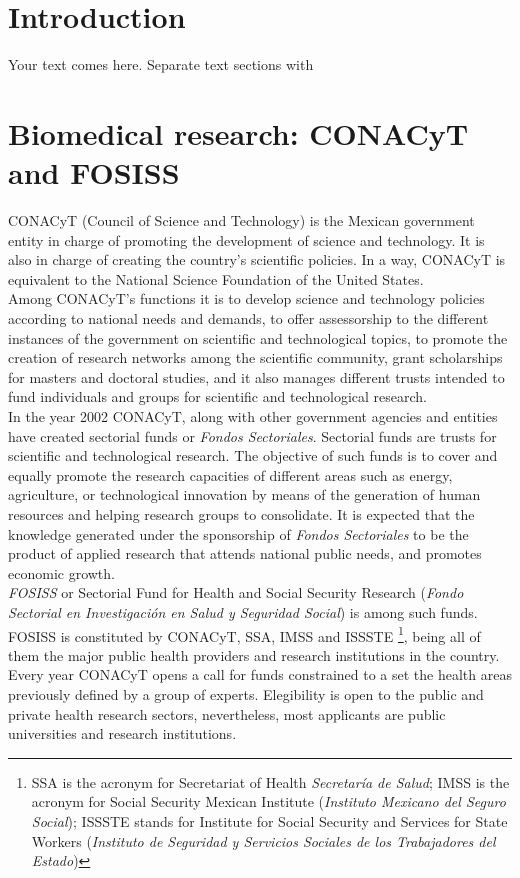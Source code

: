 \section{Introduction}
\label{intro}

Your text comes here. Separate text sections with



\section{Biomedical research: CONACyT and FOSISS}
\label{sec:1}
CONACyT (Council of Science and Technology) is the Mexican government entity in charge of promoting the development of science and
technology. It is also in charge of creating the country's scientific
policies. In a way, CONACyT is equivalent to the National Science Foundation of the United States.\\

Among CONACyT's functions it is to develop science and technology
policies according to national needs and demands, to offer
assessorship to the different instances of the government on
scientific and technological topics, to promote the creation of
research networks among the scientific community, grant scholarships
for masters and doctoral studies, and it also manages different trusts intended to fund individuals
and groups for scientific and technological research. \\

In the year 2002 CONACyT, along with other government agencies and entities have created sectorial funds or \emph{Fondos Sectoriales}. Sectorial funds are trusts for scientific and technological research. The objective of such funds is to cover and equally promote the research capacities of different areas such as energy, agriculture, or technological innovation by means of the generation of human resources and helping research groups to consolidate. It is expected that the knowledge generated under the sponsorship of \emph{Fondos Sectoriales} to be the product of applied research that attends national public needs, and promotes economic growth.\\

\emph{FOSISS} or Sectorial Fund for Health and Social Security Research (\emph{Fondo Sectorial en Investigaci\'on en Salud y Seguridad Social}) is among such funds. FOSISS is constituted by CONACyT, SSA, IMSS and ISSSTE \footnote{SSA is the acronym for Secretariat of Health \emph{Secretar\'ia de Salud}; IMSS is the acronym for Social Security Mexican Institute (\emph{Instituto Mexicano del Seguro Social}); ISSSTE stands for Institute for Social Security and Services for State Workers (\emph{Instituto de Seguridad y Servicios Sociales de los Trabajadores del Estado})}, being all of them the major public health providers and research institutions in the country. Every year CONACyT opens a call for funds constrained to a set the health areas previously defined by a group of experts. Elegibility is open to the public and private health research sectors, nevertheless, most applicants are public universities and research institutions. 


